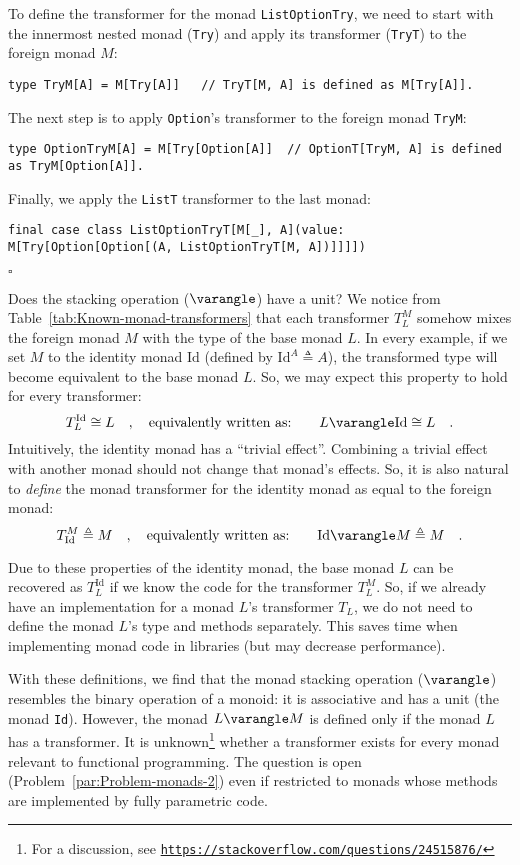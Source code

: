 To define the transformer for the monad \lstinline!ListOptionTry!,
we need to start with the innermost nested monad (\lstinline!Try!)
and apply its transformer (\lstinline!TryT!) to the foreign monad
$M$:
\begin{lstlisting}
type TryM[A] = M[Try[A]]   // TryT[M, A] is defined as M[Try[A]].
\end{lstlisting}
The next step is to apply \lstinline!Option!\textsf{'}s transformer to the
foreign monad \lstinline!TryM!:
\begin{lstlisting}
type OptionTryM[A] = M[Try[Option[A]]  // OptionT[TryM, A] is defined as TryM[Option[A]].
\end{lstlisting}
Finally, we apply the \lstinline!ListT! transformer to the last monad:
\begin{lstlisting}
final case class ListOptionTryT[M[_], A](value: M[Try[Option[Option[(A, ListOptionTryT[M, A])]]]])
\end{lstlisting}
$\square$

Does the stacking operation ($\varangle$) have a unit? We notice
from Table~\ref{tab:Known-monad-transformers} that each transformer
$T_{L}^{M}$ somehow mixes the foreign monad $M$ with the type of
the base monad $L$. In every example, if we set $M$ to the identity
monad $\text{Id}$ (defined by $\text{Id}^{A}\triangleq A$), the
transformed type will become equivalent to the base monad $L$. So,
we may expect this property to hold for every transformer:
\[
T_{L}^{\text{Id}}\cong L\quad,\quad\text{equivalently written as:}\quad\quad L\varangle\text{Id}\cong L\quad.
\]
Intuitively, the identity monad has a \textsf{``}trivial effect\textsf{''}. Combining
a trivial effect with another monad should not change that monad\textsf{'}s
effects. So, it is also natural to \emph{define} the monad transformer
for the identity monad as equal to the foreign monad:
\[
T_{\text{Id}}^{M}\triangleq M\quad,\quad\text{equivalently written as:}\quad\quad\text{Id}\varangle M\triangleq M\quad.
\]

Due to these properties of the identity monad, the base monad $L$
can be recovered as $T_{L}^{\text{Id}}$ if we know the code for the
transformer $T_{L}^{M}$. So, if we already have an implementation
for a monad $L$\textsf{'}s transformer $T_{L}$, we do not need to define
the monad $L$\textsf{'}s type and methods separately. This saves time when
implementing monad code in libraries (but may decrease performance).

With these definitions, we find that the monad stacking operation
($\varangle$) resembles the binary operation of a monoid: it is associative
and has a unit (the monad \lstinline!Id!). However, the monad $L\varangle M$
is defined only if the monad $L$ has a transformer. It is unknown\footnote{For a discussion, see \texttt{\href{https://stackoverflow.com/questions/24515876/}{https://stackoverflow.com/questions/24515876/}}}
whether a transformer exists for every monad relevant to functional
programming. The question is open (Problem~\ref{par:Problem-monads-2})
even if restricted to monads whose methods are implemented by fully
parametric code.

